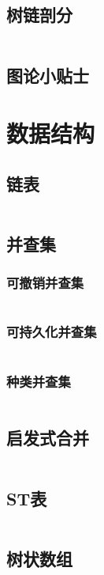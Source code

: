 \documentclass[a4paper,11pt]{article}
\begin{document}
\subsection{树链剖分} 
\inputminted[breaklines]{c++}{图论/树链剖分.cpp}
\subsection{图论小贴士} 


\section{数据结构} 

\subsection{链表}
\inputminted[breaklines]{c++}{数据结构/链表.cpp} 

\subsection{并查集} 
\subsubsection{可撤销并查集} 
\inputminted[breaklines]{c++}{数据结构/可撤销并查集.cpp}

\subsubsection{可持久化并查集} 
\inputminted[breaklines]{c++}{数据结构/可持久化并查集.cpp} 

\subsubsection{种类并查集}
\inputminted[breaklines]{c++}{数据结构/种类并查集.cpp} 

\subsection{启发式合并}
\inputminted[breaklines]{c++}{数据结构/启发式合并.cpp} 

\subsection{ST表}
\inputminted[breaklines]{c++}{数据结构/ST表.cpp}

\subsection{树状数组}
\inputminted[breaklines]{c++}{数据结构/树状数组.cpp}
\end{document}
